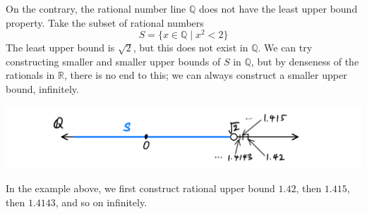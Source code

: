 \documentclass{article}
\theoremstyle{remark}
\theoremstyle{definition}
\begin{document}
On the contrary, the rational number line $\mathbb{Q}$ does not have the least upper bound property. Take the subset of rational numbers
\[S = \{x \in \mathbb{Q} \;|\; x^2 <2 \}\]
The least upper bound is $\sqrt{2}$, but this does not exist in $\mathbb{Q}$. We can try constructing smaller and smaller upper bounds of $S$ in $\mathbb{Q}$, but by denseness of the rationals in $\mathbb{R}$, there is no end to this; we can always construct a smaller upper bound, infinitely. 
\begin{center}
  \includegraphics[scale=0.25]{img/Least_Upper_Bound_Property.PNG}
\end{center}
In the example above, we first construct rational upper bound $1.42$, then $1.415$, then $1.4143$, and so on infinitely. 
\end{document}
